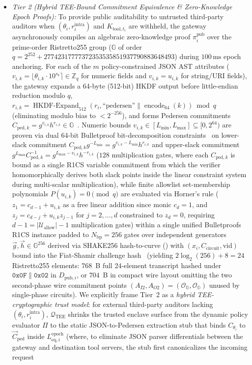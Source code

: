 \documentclass[conference,10pt]{IEEEtran}
\begin{document}
\begin{itemize}
    \item \emph{Tier 2 (Hybrid TEE-Bound Commitment Equivalence \& Zero-Knowledge Epoch Proofs):} To provide public auditability to untrusted third-party auditors when $(\theta_i, r_i^{\text{intra}})$ and $K_{\text{tool}, t_i}$ are withheld, the gateway asynchronously compiles an algebraic zero-knowledge proof $\pi_i^{\text{pub}}$ over the prime-order Ristretto255 group ($\mathbb{G}$ of order $q = 2^{252} + 27742317777372353535851937790883648493$) during $100\,\text{ms}$ epoch anchoring. For each of the $m$ policy-constrained JSON AST attributes ($v_{i,k} = \lfloor \theta_{i,k} \cdot 10^{s_k} \rceil \in \mathbb{Z}_q$ for numeric fields and $v_{i,k} = u_{i,k}$ for string/URI fields), the gateway expands a 64-byte (512-bit) HKDF output before little-endian reduction modulo $q$, $r_{i,k} = \operatorname{HKDF-Expand}_{512}(r_i, \text{``pedersen''} \parallel \operatorname{encode}_{64}(k)) \bmod q$ (eliminating modulo bias to $< 2^{-256}$), and forms Pedersen commitments $C_{\text{ped}, k} = g^{v_{i,k}} h^{r_{i,k}} \in \mathbb{G}$~\cite{pedersen1991non}. Numeric bounds $v_{i,k} \in [L_{\min}, L_{\max}] \subseteq [0, 2^{64})$ are proven via dual 64-bit Bulletproof bit-decomposition constraints~\cite{bunz2018bulletproofs} on lower-slack commitment $C_{\text{ped}, k} g^{-L_{\min}} = g^{v_{i,k} - L_{\min}} h^{r_{i,k}}$ and upper-slack commitment $g^{L_{\max}} C_{\text{ped}, k}^{-1} = g^{L_{\max} - v_{i,k}} h^{-r_{i,k}}$ ($128$ multiplication gates, where each $C_{\text{ped},k}$ is bound as a single R1CS variable commitment from which the verifier homomorphically derives both slack points inside the linear constraint system during multi-scalar multiplication), while finite allowlist set-membership polynomials $P(u_{i,k}) = 0 \pmod q$ are evaluated via Horner's rule ($z_1 = c_{d-1} + u_{i,k}$ as a free linear addition since monic $c_d = 1$, and $z_j = c_{d-j} + u_{i,k} z_{j-1}$ for $j=2,\dots,d$ constrained to $z_d = 0$, requiring $d - 1 = |\mathcal{U}_{\text{allow}}| - 1$ multiplication gates) within a single unified Bulletproofs R1CS instance padded to $N_{\text{bp}} = 256$ gates over independent generators $\vec{g}, \vec{h} \in \mathbb{G}^{256}$ derived via SHAKE256 hash-to-curve () with $(x_i, C_{\text{circuit}}, \text{vid})$ bound into the Fiat-Shamir challenge hash~\cite{fiat1986how} (yielding $2\log_2(256) + 8 = 24$ Ristretto255 elements: $768$~B full 24-element transcript hashed under $\mathtt{0x0F}\parallel\mathtt{0x02}$ in $D_{\text{pub},i}$, or $704$~B in compact wire layout omitting the two second-phase wire commitment points $(A_{I2}, A_{O2}) = (\mathcal{O}_{\mathbb{G}}, \mathcal{O}_{\mathbb{G}})$ unused by single-phase circuits). We explicitly frame Tier~2 as a \emph{hybrid TEE-cryptographic trust model}: for external third-party auditors lacking $(\theta_i, r_i^{\text{intra}})$, $\mathcal{Q}_{\text{TEE}}$ shrinks the trusted enclave surface from the dynamic policy evaluator $\Pi$ to the static JSON-to-Pedersen extraction stub that binds $C_{\theta_i}$ to $\vec{C}_{\text{ped}}$ inside $L_{\text{eq}, i}^{\text{epoch}}$ (where, to eliminate JSON parser differentials between the gateway and destination tool servers, the stub first canonicalizes the incoming request 
\end{itemize}
\end{document}
